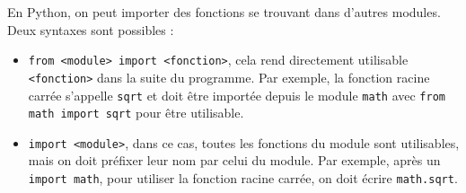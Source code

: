 \documentclass[11pt,a4paper]{article}
\begin{document}
\begin{tcolorbox}[left=0cm,title=\bf{\faPython \; Importation de fonctions},colbacktitle=cfond]
    En Python, on peut importer des fonctions se trouvant dans d'autres modules. Deux syntaxes sont possibles :
    \begin{itemize}
        \item[\textbullet] {\tt from <module> import <fonction>}, cela rend directement utilisable {\tt <fonction>} dans la suite du programme. Par exemple, la fonction racine carrée s'appelle \texttt{sqrt} et doit être importée depuis le module \texttt{math} avec \texttt{from math import sqrt} pour être utilisable.
        \item[\textbullet] {\tt import <module>}, dans ce cas, toutes les fonctions du module sont utilisables, mais on doit préfixer leur nom par celui du module. Par exemple, après un \texttt{import math}, pour utiliser la fonction racine carrée, on doit écrire \texttt{math.sqrt}.
    \end{itemize}
\end{tcolorbox}
\end{document}
